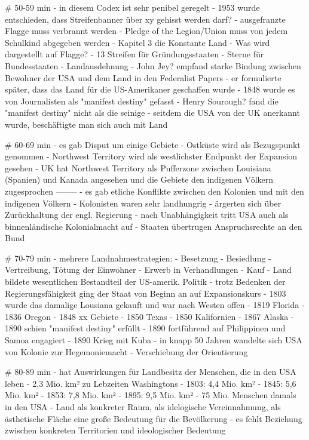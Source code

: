 \documentclass[10pt,a4paper,oneside,ngerman,numbers=noenddot]{scrartcl}
\begin{document}
# 50-59 min
- in diesem Codex ist sehr penibel geregelt
- 1953 wurde entschieden, dass Streifenbanner über xy gehisst werden darf?
- ausgefranzte Flagge muss verbrannt werden
- Pledge of the Legion/Union muss von jedem Schulkind abgegeben werden
- Kapitel 3 die Konstante Land
- Was wird dargestellt auf Flagge?
    - 13 Streifen für Gründungsstaaten
    - Sterne für Bundesstaaten
    - Landausdehnung
- John Jey? empfand starke Bindung zwischen Bewohner der USA und dem Land in den Federalist Papers
- er formulierte später, dass das Land für die US-Amerikaner geschaffen wurde
- 1848 wurde es von Journalisten als "manifest destiny" gefasst
- Henry Sourough? fand die "manifest destiny" nicht als die seinige
- seitdem die USA von der UK anerkannt wurde, beschäftigte man sich auch mit Land

# 60-69 min
- es gab Disput um einige Gebiete
- Ostküste wird als Bezugspunkt genommen
- Northwest Territory wird als westlichster Endpunkt der Expansion gesehen
- UK hat Northwest Territory als Pufferzone zwischen Louisiana (Spanien) und Kanada
  angesehen und die Gebiete den indigenen Völkern zugesprochen
--------
- es gab etliche Konflikte zwischen den Kolonien und mit den indigenen Völkern
- Kolonisten waren sehr landhungrig
- ärgerten sich über Zurückhaltung der engl. Regierung
- nach Unabhängigkeit tritt USA auch als binnenländische Kolonialmacht auf
- Staaten übertrugen Anspruchsrechte an den Bund

# 70-79 min
- mehrere Landnahmestrategien:
    - Besetzung
    - Besiedlung
    - Vertreibung, Tötung der Einwohner
    - Erwerb in Verhandlungen
    - Kauf
- Land bildete wesentlichen Bestandteil der US-amerik. Politik
- trotz Bedenken der Regierungsfähigkeit ging der Staat von Beginn an auf Expansionskurs
- 1803 wurde das damalige Lousiana gekauft und war nach Westen offen
- 1819 Florida
- 1836 Oregon
- 1848 xx Gebiete
- 1850 Texas
- 1850 Kalifornien
- 1867 Alaska
- 1890 schien "manifest destiny" erfüllt
- 1890 fortführend auf Philippinen und Samoa engagiert
- 1890 Krieg mit Kuba
- in knapp 50 Jahren wandelte sich USA von Kolonie zur Hegemoniemacht
- Verschiebung der Orientierung

# 80-89 min
- hat Auswirkungen für Landbesitz der Menschen, die in den USA leben
- 2,3 Mio. km² zu Lebzeiten Washingtons
- 1803: 4,4 Mio. km²
- 1845: 5,6 Mio. km²
- 1853: 7,8 Mio. km²
- 1895: 9,5 Mio. km²
- 75 Mio. Menschen damals in den USA
- Land als konkreter Raum, als idelogische Vereinnahmung, als ästhetische Fläche eine
  große Bedeutung für die Bevölkerung
- es fehlt Beziehung zwischen konkreten Territorien und ideologischer Bedeutung
\end{document}
